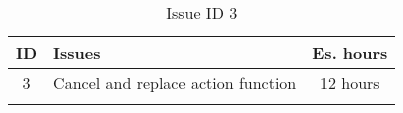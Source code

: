 \begin{longtable} { | c | p{12cm} | c | } 
\hline
	ID 	&	Issues	&		 Es. hours \\\hline
	3 	&	Cancel and replace action function	&	12 hours \\\hline
\caption{Issue ID 3}
\label{tab:spr3_cancelreplaceaction}
\end{longtable}
